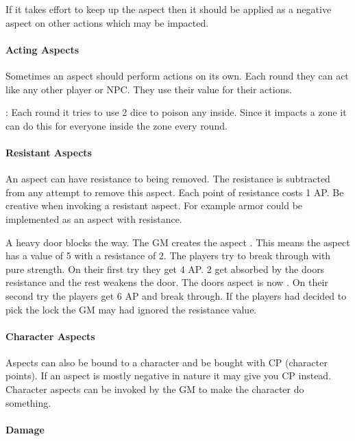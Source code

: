 \documentclass[11pt]{article}
\begin{document}
{If it takes effort to keep up the aspect then it should be applied as a negative aspect on other actions which may be impacted.
\paragraph*{Acting Aspects}
\label{sec:org3e768d0}

Sometimes an aspect should perform actions on its own. Each round they can act like any other player or NPC. They use their value for their actions.

\begin{pwexample}
: Each round it tries to use 2 dice to poison any inside. Since it impacts a zone it can do this for everyone inside the zone every round.
\end{pwexample}
\paragraph*{Resistant Aspects}
\label{sec:orgf0a3c53}
An aspect can have resistance to being removed. The resistance is subtracted from any attempt to remove this aspect. Each point of resistance costs 1 AP. Be creative when invoking a resistant aspect. For example armor could be implemented as an aspect with resistance.

\begin{pwexample}
A heavy door blocks the way. The GM creates the aspect . This means the aspect has a value of 5 with a resistance of 2. The players try to break through with pure strength. On their first try they get 4 AP. 2 get absorbed by the doors resistance and the rest weakens the door. The doors aspect is now . On their second try the players get 6 AP and break through.
If the players had decided to pick the lock the GM may had ignored the resistance value.
\end{pwexample}
\paragraph*{Character Aspects}
\label{sec:org6526582}

Aspects can also be bound to a character and be bought with CP (character points). If an aspect is mostly negative in nature it may give you CP instead. Character aspects can be invoked by the GM to make the character do something. 
\paragraph*{Damage}
\label{sec:org9b630b3}

}
\end{document}

